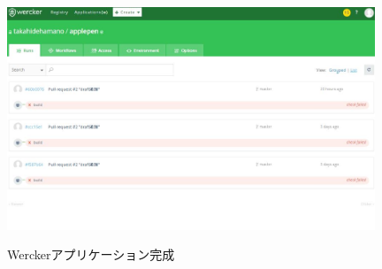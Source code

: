 \newpage
\begin{figure}[htb]
\centering　
\includegraphics[width=11cm]{35.JPG}
\caption{Werckerアプリケーション完成}\label{tab:uac}
\end{figure}


